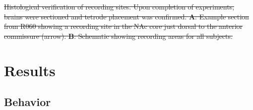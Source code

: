 \documentclass[11pt]{article}
\newcommand{\bsf}[1]{\textbf{#1}}
\providecommand{\DIFdel}[1]{{\protect\color{red}\sout{#1}}}                      %
\providecommand{\DIFdelend}{} %
\providecommand{\DIFdelFL}[1]{\DIFdel{#1}} %
\DeclareRobustCommand{\DIFdelend}{\DIFOaddend \let\includegraphics\DIFOincludegraphics} %
\begin{document}
{%
\DIFdelFL{Histological verification of recording sites. Upon completion of
  experiments, brains were sectioned and tetrode placement was
  confirmed. \bsf{A}: Example section from R060 showing a recording site in the
  NAc core just dorsal to the anterior commissure (arrow). \bsf{B}:
  Schematic showing recording areas for all subjects.}}

\DIFdelend \section*{Results}

\subsection*{Behavior}
\end{document}
